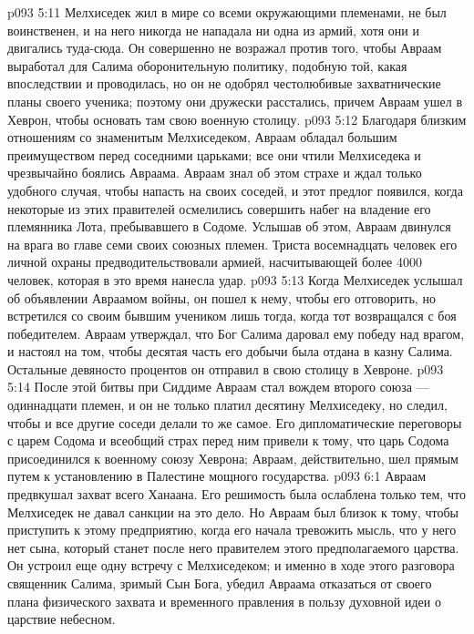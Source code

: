 \vs p093 5:11 Мелхиседек жил в мире со всеми окружающими племенами, не был воинственен, и на него никогда не нападала ни одна из армий, хотя они и двигались туда\hyp{}сюда. Он совершенно не возражал против того, чтобы Авраам выработал для Салима оборонительную политику, подобную той, какая впоследствии и проводилась, но он не одобрял честолюбивые захватнические планы своего ученика; поэтому они дружески расстались, причем Авраам ушел в Хеврон, чтобы основать там свою военную столицу.
\vs p093 5:12 Благодаря близким отношениям со знаменитым Мелхиседеком, Авраам обладал большим преимуществом перед соседними царьками; все они чтили Мелхиседека и чрезвычайно боялись Авраама. Авраам знал об этом страхе и ждал только удобного случая, чтобы напасть на своих соседей, и этот предлог появился, когда некоторые из этих правителей осмелились совершить набег на владение его племянника Лота, пребывавшего в Содоме. Услышав об этом, Авраам двинулся на врага во главе семи своих союзных племен. Триста восемнадцать человек его личной охраны предводительствовали армией, насчитывающей более 4000 человек, которая в это время нанесла удар.
\vs p093 5:13 Когда Мелхиседек услышал об объявлении Авраамом войны, он пошел к нему, чтобы его отговорить, но встретился со своим бывшим учеником лишь тогда, когда тот возвращался с боя победителем. Авраам утверждал, что Бог Салима даровал ему победу над врагом, и настоял на том, чтобы десятая часть его добычи была отдана в казну Салима. Остальные девяносто процентов он отправил в свою столицу в Хевроне.
\vs p093 5:14 После этой битвы при Сиддиме Авраам стал вождем второго союза --- одиннадцати племен, и он не только платил десятину Мелхиседеку, но следил, чтобы и все другие соседи делали то же самое. Его дипломатические переговоры с царем Содома и всеобщий страх перед ним привели к тому, что царь Содома присоединился к военному союзу Хеврона; Авраам, действительно, шел прямым путем к установлению в Палестине мощного государства.
\vs p093 6:1 Авраам предвкушал захват всего Ханаана. Его решимость была ослаблена только тем, что Мелхиседек не давал санкции на это дело. Но Авраам был близок к тому, чтобы приступить к этому предприятию, когда его начала тревожить мысль, что у него нет сына, который станет после него правителем этого предполагаемого царства. Он устроил еще одну встречу с Мелхиседеком; и именно в ходе этого разговора священник Салима, зримый Сын Бога, убедил Авраама отказаться от своего плана физического захвата и временного правления в пользу духовной идеи о царствие небесном.
